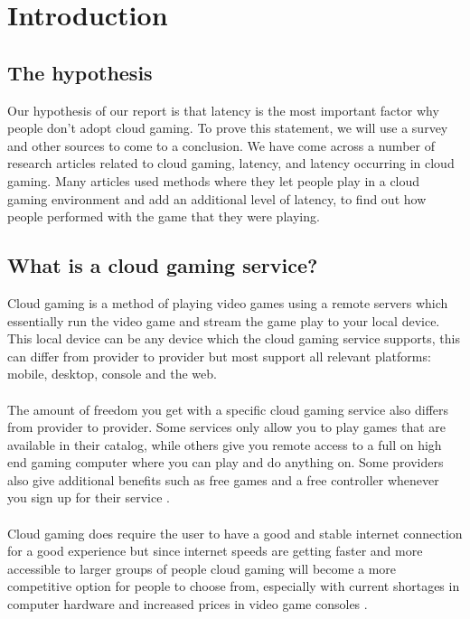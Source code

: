 \section{Introduction}

\subsection{The hypothesis}
Our hypothesis of our report is that latency is the most important factor why people don't adopt cloud gaming. To prove this statement, we will use a survey and other sources to come to a conclusion. We have come across a number of research articles related to cloud gaming, latency, and latency occurring in cloud gaming. Many articles used methods where they let people play in a cloud gaming environment and add an additional level of latency, to find out how people performed with the game that they were playing. 

\subsection{What is a cloud gaming service?}
Cloud gaming is a method of playing video games using a remote servers which essentially run the video game and stream the game play to your local device.
This local device can be any device which the cloud gaming service supports,
this can differ from provider to provider but most support all relevant platforms: mobile, desktop, console and the web.\\\\ 
The amount of freedom you get with a specific cloud gaming service also differs from provider to provider. Some services only allow you to play games that are available in their catalog, while others give you remote access to a full on high end gaming computer where you can play and do anything on. Some providers also give additional benefits such as free games and a free controller whenever you sign up for their service \parencite{stadia}.\\\\
Cloud gaming does require the user to have a good and stable internet connection for a good experience but since internet speeds are getting faster and more accessible to larger groups of people cloud gaming will become a more competitive option for people to choose from, especially with current shortages in computer hardware and increased prices in video game consoles \parencite{ps5pricegraphovertime}.

